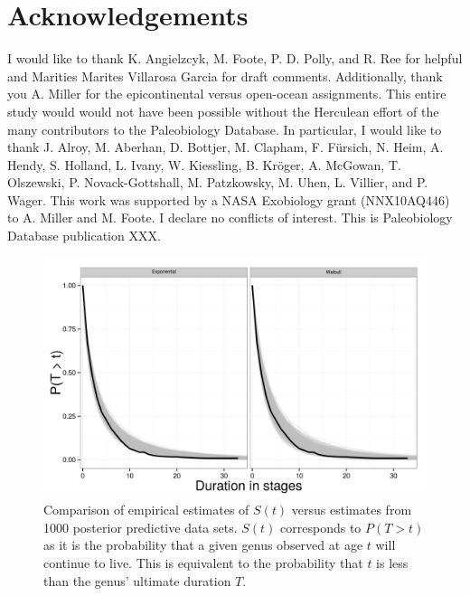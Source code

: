 \documentclass{article}
\begin{document}
\section*{Acknowledgements}
I would like to thank K. Angielzcyk, M. Foote, P. D. Polly, and R. Ree for helpful and Marities Marites Villarosa Garcia for draft comments. Additionally, thank you A. Miller for the epicontinental versus open-ocean assignments. This entire study would would not have been possible without the Herculean effort of the many contributors to the Paleobiology Database. In particular, I would like to thank J. Alroy, M. Aberhan, D. Bottjer, M. Clapham, F. F\"{u}rsich, N. Heim, A. Hendy, S. Holland, L. Ivany, W. Kiessling, B. Kr\"{o}ger, A. McGowan, T. Olszewski, P. Novack-Gottshall, M. Patzkowsky, M. Uhen, L. Villier, and P. Wager. This work was supported by a NASA Exobiology grant (NNX10AQ446) to A. Miller and M. Foote. I declare no conflicts of interest. This is Paleobiology Database publication XXX.

\clearpage




\clearpage

\begin{figure}[ht]
  \centering
  \includegraphics[height = 0.5\textheight,width=\textwidth,keepaspectratio=true]{figure/survival_curves}
  \caption{Comparison of empirical estimates of \(S(t)\) versus estimates from 1000 posterior predictive data sets. \(S(t)\) corresponds to \(P(T > t)\) as it is the probability that a given genus observed at age \(t\) will continue to live. This is equivalent to the probability that \(t\) is less than the genus' ultimate duration \(T\).}
  \label{fig:surv}
\end{figure}
\end{document}
